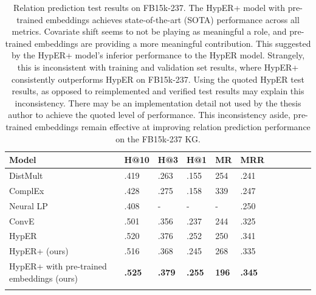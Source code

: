 \begin{table}
		\centering
		\begin{tabular}{lllllllllll}
  			\textbf{Model} & \textbf{H@10} & \textbf{H@3} & \textbf{H@1} & \textbf{MR} & \textbf{MRR} \\
  			\hline
  			DistMult \unskip~\citep{yang2014embedding} & .419 & .263 & .155 & 254 & .241 \\
  			ComplEx \unskip~\citep{trouillon2016complex} & .428 & .275 & .158 & 339 & .247 \\
  			Neural LP  \unskip~\citep{yang2017differentiable} & .408 & - & - & - & .250 \\
			ConvE \unskip~\citep{dettmers2018convolutional} & .501 & .356 & .237 & 244 & .325 \\
			HypER \unskip~\citep{balazevic2019hypernetwork} & .520 & .376 & .252 & 250 & .341 \\
			HypER+ (ours) & .516 & .368 & .245 & 268 & .335 \\
  			\hline
  			HypER+ with pre-trained embeddings (ours) & \textbf{.525} & \textbf{.379} & \textbf{.255} & \textbf{196} & \textbf{.345} \\
			&
		\end{tabular}
		\captionsetup{justification=centering}
		\caption{Relation prediction test results on FB15k-237. The HypER+ model with pre-trained embeddings achieves state-of-the-art (SOTA) performance across all metrics. Covariate shift seems to not be playing as meaningful a role, and pre-trained embeddings are providing a more meaningful contribution. This suggested by the HypER+ model's inferior performance to the HypER model. Strangely, this is inconsistent with training and validation set results, where HypER+ consistently outperforms HypER on FB15k-237. Using the quoted HypER test results, as opposed to reimplemented and verified test results may explain this inconsistency. There may be an implementation detail not used by the thesis author to achieve the quoted level of performance. This inconsistency aside, pre-trained embeddings remain effective at improving relation prediction performance on the FB15k-237 KG.}
\end{table}



